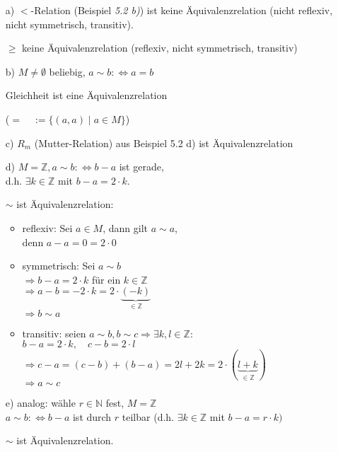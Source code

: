 \documentclass[a4paper, 12pt, twoside] {article}
\begin{document}
\begin{itemize}
\item[a)] $<$-Relation (Beispiel \textit{5.2 b)}) ist keine Äquivalenzrelation (nicht reflexiv, nicht symmetrisch, transitiv).

$\geq$ keine Äquivalenzrelation (reflexiv, nicht symmetrisch, transitiv)

\item[b)] $M \neq \emptyset$ beliebig, $a \sim b :\Leftrightarrow a = b$

Gleichheit ist eine Äquivalenzrelation

($= \quad := \{(a,a) \mid a \in M\}$)

\item[c)] $R_m$ (Mutter-Relation) aus Beispiel 5.2 d) ist Äquivalenzrelation


\item[d)] $M = \mathbb{Z}, a \sim b: \Leftrightarrow b - a$ ist gerade, \\
d.h. $\exists k \in \mathbb{Z}$ mit $b-a = 2 \cdot k$.

$\sim$ ist Äquivalenzrelation:
\begin{itemize}
\item reflexiv: Sei $a \in M$, dann gilt $a \sim a$, \\
denn $a-a = 0 = 2 \cdot 0$

\item symmetrisch: Sei $a \sim b$ \\
$\Rightarrow b-a = 2 \cdot k$ für ein $k \in \mathbb{Z}$ \\
$\Rightarrow a-b = -2 \cdot k = 2 \cdot  \underbrace{(-k)}_{\in \mathbb{Z}}$ \\
$\Rightarrow b \sim a$

\item transitiv: seien $a \sim b, b \sim c \Rightarrow \exists k, l \in \mathbb{Z}$: \\
$b-a = 2 \cdot k, \quad c-b = 2 \cdot l$ \\
$\Rightarrow c-a = (c-b) + (b-a) = 2l + 2k = 2 \cdot (\underbrace{l+k}_{\in \mathbb{Z}})$ \\
$\Rightarrow a \sim c$

\end{itemize}

\item[e)] analog: wähle $r \in \mathbb{N}$ fest, $M = \mathbb{Z}$ \\
$a \sim b: \Leftrightarrow b - a$ ist durch $r$ teilbar (d.h. $\exists k \in \mathbb{Z}$ mit $b-a = r \cdot k)$

$\sim$ ist Äquivalenzrelation.

\end{itemize}
\end{document}
